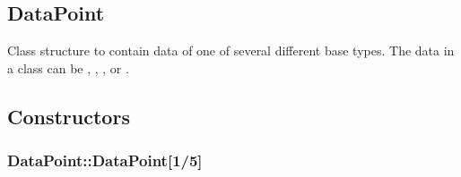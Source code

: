 \documentclass[letterpaper,10pt,english]{sphinxmanual}
\begin{document}
\subsection{DataPoint}
\label{\detokenize{datapoint:datapoint}}

\begin{fulllineitems}
\label{\detokenize{datapoint:_CPPv2N6pessum9DataPointE}}%
\pysigstartmultiline
{}%
\pysigstopmultiline
Class structure to contain data of one of several different base types. The
data in a {\hyperref[\detokenize{datapoint:_CPPv2N6pessum9DataPointE}]{}} class can be , ,
, or .

\begin{sphinxVerbatim}[commandchars=\\\{\}]
 
   
   
   
   

    
   
   
   
\end{sphinxVerbatim}

\end{fulllineitems}



\subsection{Constructors}
\label{\detokenize{datapoint:constructors}}

\subsubsection{DataPoint::DataPoint{[}1/5{]}}
\label{\detokenize{datapoint:datapoint-datapoint-1-5}}
\end{document}
